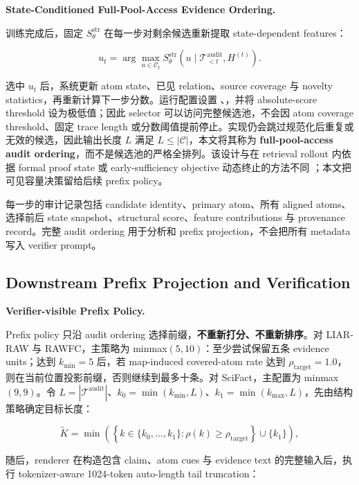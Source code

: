 \documentclass[letterpaper]{article}
\begin{document}
\textbf{State-Conditioned Full-Pool-Access Evidence Ordering.}

训练完成后，固定 $S_\theta^{\mathrm{str}}$ 在每一步对剩余候选重新提取 state-dependent features：

\[
u_t=\arg\max_{u\in\mathcal C_t}
S_\theta^{\mathrm{str}}(u\mid\mathcal T_{<t}^{\mathrm{audit}},H^{(t)}).
\]

选中 $u_t$ 后，系统更新 atom state、已见 relation、source coverage 与 novelty statistics，再重新计算下一步分数。运行配置设置 \texttt{}、\texttt{}，并将 absolute-score threshold 设为极低值；因此 selector 可以访问完整候选池，不会因 atom coverage threshold、固定 trace length 或分数阈值提前停止。实现仍会跳过规范化后重复或无效的候选，因此输出长度 $L$ 满足 $L\le |\mathcal C|$，本文将其称为 \textbf{full-pool-access audit ordering}，而不是候选池的严格全排列。该设计与在 retrieval rollout 内依据 formal proof state 或 early-sufficiency objective 动态终止的方法不同 \citep{Aly2022NaturalLogic,Alt2026EvidenceRanking}；本文把可见容量决策留给后续 prefix policy。

每一步的审计记录包括 candidate identity、primary atom、所有 aligned atoms、选择前后 state snapshot、structural score、feature contributions 与 provenance record。完整 audit ordering 用于分析和 prefix projection，不会把所有 metadata 写入 verifier prompt。

\subsection{Downstream Prefix Projection and Verification}

\textbf{Verifier-visible Prefix Policy.}

Prefix policy 只沿 audit ordering 选择前缀，\textbf{不重新打分、不重新排序}。对 LIAR-RAW 与 RAWFC，主策略为 minmax$(5,10)$：至少尝试保留五条 evidence units；达到 $k_{\min}=5$ 后，若 map-induced covered-atom rate 达到 $\rho_{\mathrm{target}}=1.0$，则在当前位置投影前缀，否则继续到最多十条。对 SciFact，主配置为 minmax$(9,9)$。令 $L=|\mathcal T^{\mathrm{audit}}|$、$k_0=\min(k_{\min},L)$、$k_1=\min(k_{\max},L)$，先由结构策略确定目标长度：

\[
\widetilde K=\min\left(
\left\{k\in\{k_0,\ldots,k_1\}:\rho(k)\ge\rho_{\mathrm{target}}\right\}
\cup\{k_1\}
\right),
\]

随后，renderer 在构造包含 claim、atom cues 与 evidence text 的完整输入后，执行 tokenizer-aware 1024-token auto-length tail truncation：
\end{document}
